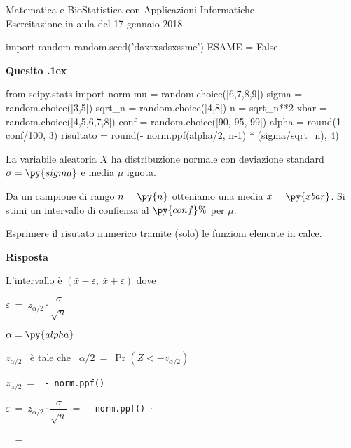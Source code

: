 \documentclass[11pt,twoside,a4paper]{article}
\newcounter{quesito}
\newenvironment{question}{\addtocounter{quesito}{1}\par\textbf{Quesito \thequesito.\kern1ex}}{\vspace{0.5\parskip}}
\newenvironment{answer}{\par\textbf{Risposta\quad}}{\vspace{\parskip}}
\begin{document}
\colorbox{blue!10}{\begin{minipage}{\textwidth}
Matematica e BioStatistica con Applicazioni Informatiche\\
Esercitazione in aula del 17 gennaio 2018
\end{minipage}}



\begin{pycode}
import random
random.seed('daxtxsdsxssme')
ESAME = False
\end{pycode}
\begin{question}
\begin{pycode}
from scipy.stats import norm
mu = random.choice([6,7,8,9])
sigma = random.choice([3,5])
sqrt_n = random.choice([4,8])
n = sqrt_n**2
xbar =  random.choice([4,5,6,7,8])
conf = random.choice([90, 95, 99])
alpha = round(1-conf/100, 3)
risultato = round(- norm.ppf(alpha/2, n-1) * (sigma/sqrt_n), 4)
\end{pycode}
La variabile aleatoria $X$ ha distribuzione normale con deviazione standard $\sigma=\py{sigma}$ e media $\mu$ ignota.

Da un campione di rango $n=\py{n}$ otteniamo una media $\bar x=\py{xbar}$. Si stimi un intervallo di confienza al $\py{conf}\%$ per $\mu$.

Esprimere il risutato numerico tramite (solo) le funzioni elencate in calce.
\begin{answer}


L'intervallo è $(\bar x-\varepsilon,\ \bar x+\varepsilon)$ dove

$\varepsilon\ =\ z_{\alpha/2}\cdot\dfrac{\sigma}{\sqrt{n}}$ 

$\alpha = \py{alpha}$

$z_{\alpha/2}$ \ è tale che \ $\alpha/2\ =\ \Pr(Z<-z_{\alpha/2})$

$z_{\alpha/2}\ =\ $\ {\tt - norm.ppf()}

$\varepsilon\ =\ z_{\alpha/2}\cdot\dfrac{\sigma}{\sqrt{n}}\ =\ ${\color{blue}\tt - norm.ppf() $\cdot$ }

$\phantom{\varepsilon}$\ =\ {\tt {}}
\end{answer}
\end{question}
\end{document}
